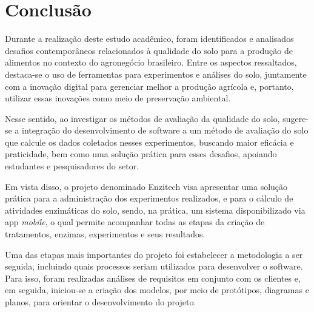 \chapter{Conclusão}\label{ch:conclusao}
Durante a realização deste estudo acadêmico, foram identificados e analisados desafios contemporâneos relacionados à qualidade do solo para a produção de alimentos no contexto do agronegócio brasileiro. Entre os aspectos ressaltados, destaca-se o uso de ferramentas para experimentos e análises do solo, juntamente com a inovação digital para gerenciar melhor a produção agrícola e, portanto, utilizar essas inovações como meio de preservação ambiental. 

Nesse sentido, ao investigar os métodos de avaliação da qualidade do solo, sugere-se a integração do desenvolvimento de software a um método de avaliação do solo que calcule os dados coletados nesses experimentos, buscando maior eficácia e praticidade, bem como uma solução prática para esses desafios, apoiando estudantes e pesquisadores do setor.

Em vista disso, o projeto denominado Enzitech visa apresentar uma solução prática para a administração dos experimentos realizados, e para o cálculo de atividades enzimáticas do solo, sendo, na prática, um sistema disponibilizado via \ac{app} \textit{mobile}, o qual permite acompanhar todas as etapas da criação de tratamentos, enzimas, experimentos e seus resultados.

Uma das etapas mais importantes do projeto foi estabelecer a metodologia a ser seguida, incluindo quais processos seriam utilizados para desenvolver o software. Para isso, foram realizadas análises de requisitos em conjunto com os clientes e, em seguida, iniciou-se a criação dos modelos, por meio de protótipos, diagramas e planos, para orientar o desenvolvimento do projeto.

